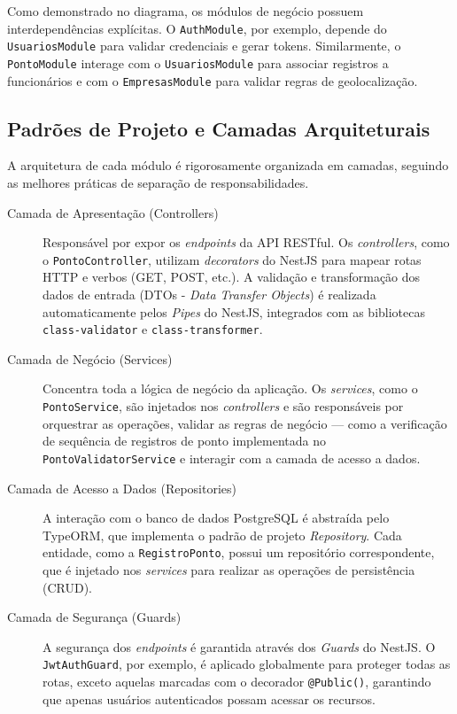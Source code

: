 Como demonstrado no diagrama, os módulos de negócio possuem interdependências explícitas. O \texttt{AuthModule}, por exemplo, depende do \texttt{UsuariosModule} para validar credenciais e gerar tokens. Similarmente, o \texttt{PontoModule} interage com o \texttt{UsuariosModule} para associar registros a funcionários e com o \texttt{EmpresasModule} para validar regras de geolocalização.

\subsection{Padrões de Projeto e Camadas Arquiteturais}

A arquitetura de cada módulo é rigorosamente organizada em camadas, seguindo as melhores práticas de separação de responsabilidades.

\begin{description}
    \item[Camada de Apresentação (Controllers)] Responsável por expor os \textit{endpoints} da API RESTful. Os \textit{controllers}, como o \texttt{PontoController}, utilizam \textit{decorators} do NestJS para mapear rotas HTTP e verbos (GET, POST, etc.). A validação e transformação dos dados de entrada (DTOs - \textit{Data Transfer Objects}) é realizada automaticamente pelos \textit{Pipes} do NestJS, integrados com as bibliotecas \texttt{class-validator} e \texttt{class-transformer}.

    \item[Camada de Negócio (Services)] Concentra toda a lógica de negócio da aplicação. Os \textit{services}, como o \texttt{PontoService}, são injetados nos \textit{controllers} e são responsáveis por orquestrar as operações, validar as regras de negócio — como a verificação de sequência de registros de ponto implementada no \texttt{PontoValidatorService} e interagir com a camada de acesso a dados.

    \item[Camada de Acesso a Dados (Repositories)] A interação com o banco de dados PostgreSQL é abstraída pelo TypeORM, que implementa o padrão de projeto \textit{Repository}. Cada entidade, como a \texttt{RegistroPonto}, possui um repositório correspondente, que é injetado nos \textit{services} para realizar as operações de persistência (CRUD).

    \item[Camada de Segurança (Guards)] A segurança dos \textit{endpoints} é garantida através dos \textit{Guards} do NestJS. O \texttt{JwtAuthGuard}, por exemplo, é aplicado globalmente para proteger todas as rotas, exceto aquelas marcadas com o decorador \texttt{@Public()}, garantindo que apenas usuários autenticados possam acessar os recursos.
\end{description}


